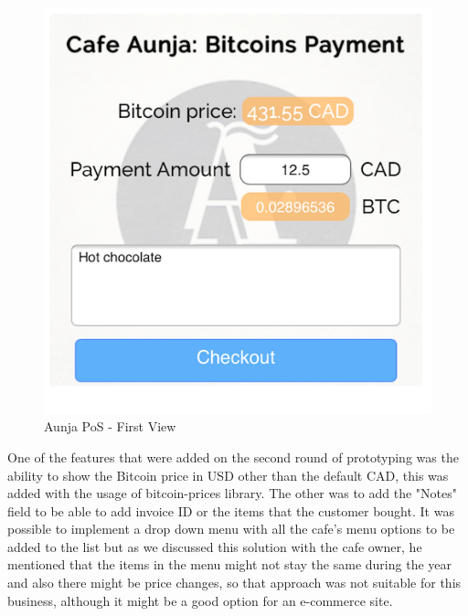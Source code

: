 \begin{figure}[htb!p]
\centering
\includegraphics[scale=0.5]{fig/First_View.png}
  \caption{Aunja PoS - First View}
\label{fig:First_View}
\end{figure}

One of the features that were added on the second round of prototyping was the ability to show the Bitcoin price in USD other than the default CAD, this was added with the usage of bitcoin-prices library. The other was to add the "Notes" field to be able to add invoice ID or the items that the customer bought. It was possible to implement a drop down menu with all the cafe's menu options to be added to the list but as we discussed this solution with the cafe owner, he mentioned that the items in the menu might not stay the same during the year and also there might be price changes, so that approach was not suitable for this business, although it might be a good option for an e-commerce site.

